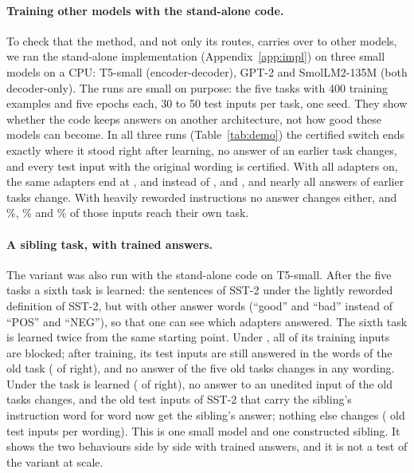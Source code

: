 \paragraph{Training other models with the stand-alone code.} To check that the method, and not
only its routes, carries over to other models, we ran the stand-alone implementation
(Appendix~\ref{app:impl}) on three small models on a CPU: T5-small (encoder-decoder), GPT-2 and
SmolLM2-135M (both decoder-only). The runs are small on purpose: the five tasks with 400 training
examples and five epochs each, 30 to 50 test inputs per task, one seed. They show whether the code
keeps answers on another architecture, not how good these models can become. In all three runs
(Table~\ref{tab:demo}) the certified switch ends exactly where it stood right after learning, no
answer of an earlier task changes, and every test input with the original wording is certified. With
all adapters on, the same adapters end at \DemoTfivePlainAP{}, \DemoGptPlainAP{} and
\DemoSmolPlainAP{} instead of \DemoTfiveAP{}, \DemoGptAP{} and \DemoSmolAP{}, and nearly all answers of
earlier tasks change. With heavily reworded instructions no answer changes either, and
\DemoTfiveHeavyRight{}\%, \DemoGptHeavyRight{}\% and \DemoSmolHeavyRight{}\% of those inputs reach
their own task.

\begin{table}[t]
  \caption{The stand-alone implementation on three small models (CPU, five tasks, 400 training
  examples and 5 epochs per task, one seed). ``Changed'': answers of the first four tasks that
  differ at the end. ``Certified'': test inputs with the original wording that are inside a zone.
  ``enc.-dec.'': encoder-decoder; ``dec.-only'': decoder-only.}
  \label{tab:demo}
  \centering
  \footnotesize
  \setlength{\tabcolsep}{3pt}
  
\end{table}

\paragraph{A sibling task, with trained answers.} The variant \exactfirst{} was also run with the
stand-alone code on T5-small. After the five tasks a sixth task is learned: the sentences of SST-2
under the lightly reworded definition of SST-2, but with other answer words (``good'' and ``bad''
instead of ``POS'' and ``NEG''), so that one can see which adapters answered. The sixth task is
learned twice from the same starting point. Under \cert{}, all \SiblingCertBlocked{} of its
\SiblingTrain{} training inputs are blocked; after training, its test inputs are still answered in
the words of the old task (\SiblingCertRight{} of \SiblingTest{} right), and no answer of the five
old tasks changes in any wording. Under \exactfirst{} the task is learned (\SiblingExactRight{} of
\SiblingTest{} right), no answer to an unedited input of the old tasks changes, and the
\SiblingExactChangedLight{} old test inputs of SST-2 that carry the sibling's instruction word for
word now get the sibling's answer; nothing else changes (\SiblingOldInputs{} old test inputs per
wording). This is one small model and one constructed sibling. It shows the two behaviours side by side with trained answers, and it is not a test of the variant at scale.





